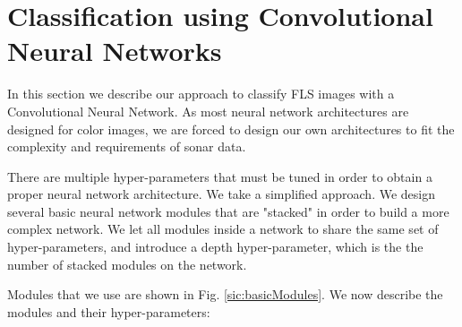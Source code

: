 \section{Classification using Convolutional Neural Networks}

In this section we describe our approach to classify FLS images with a Convolutional Neural Network. As most neural network architectures are designed for color images, we are forced to design our own architectures to fit the complexity and requirements of sonar data.

There are multiple hyper-parameters that must be tuned in order to obtain a proper neural network architecture. We take a simplified approach. We design several basic neural network modules that are "stacked" in order to build a more complex network. We let all modules inside a network to share the same set of hyper-parameters, and introduce a depth hyper-parameter, which is the the number of stacked modules on the network.

Modules that we use are shown in Fig. \ref{sic:basicModules}. We now describe the modules and their hyper-parameters:

